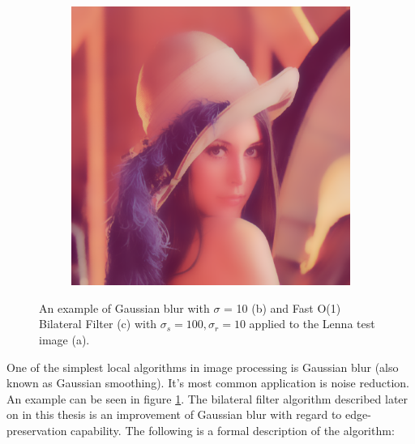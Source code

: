 \documentclass [12pt,a4paper]{report}
\begin{document}
\begin{figure}[h]
\begin{subfigure}{.5\textwidth}
  \caption{}
\end{subfigure}
\\
\\
\begin{subfigure}{1.0\textwidth}
  \centering
  \includegraphics[scale=0.73]{Lenna_bf_100_10.eps} %
  \caption{}
\end{subfigure}
\caption[An example of Gaussian blur and bilateral filter]{An example of Gaussian blur with $\sigma$ = 10 (b) and Fast O(1) Bilateral Filter (c) with $\sigma_s=100, \sigma_r=10$ applied to the Lenna test image (a)\cite{lenna}.}
\label{fig_gaussian_blur}
\end{figure}

One of the simplest local algorithms in image processing is Gaussian blur (also known as Gaussian smoothing). It's most common application is noise reduction. An example can be seen in figure \ref{fig_gaussian_blur}. The bilateral filter algorithm described later on in this thesis is an improvement of Gaussian blur with regard to edge-preservation capability. The following is a formal description of the algorithm:
\end{document}
